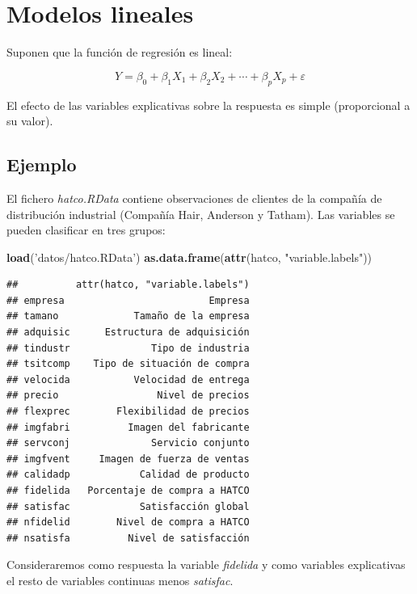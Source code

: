\documentclass[]{book}
\newenvironment{Shaded}{\begin{snugshade}}{\end{snugshade}}
\newcommand{\KeywordTok}[1]{\textcolor[rgb]{0.13,0.29,0.53}{\textbf{#1}}}
\newcommand{\StringTok}[1]{\textcolor[rgb]{0.31,0.60,0.02}{#1}}
\newcommand{\NormalTok}[1]{#1}
\begin{document}
\chapter{Modelos lineales}\label{modelos-lineales}

Suponen que la función de regresión es lineal:

\[Y=\beta_{0}+\beta_{1}X_{1}+\beta_{2}X_{2}+\cdots+\beta_{p}X_{p}+\varepsilon\]

El efecto de las variables explicativas sobre la respuesta es simple
(proporcional a su valor).

\section{Ejemplo}\label{ejemplo}

El fichero \emph{hatco.RData} contiene observaciones de clientes de la
compañía de distribución industrial (Compañía Hair, Anderson y Tatham).
Las variables se pueden clasificar en tres grupos:

\begin{Shaded}
\begin{Highlighting}[]
\KeywordTok{load}\NormalTok{(}\StringTok{'datos/hatco.RData'}\NormalTok{)}
\KeywordTok{as.data.frame}\NormalTok{(}\KeywordTok{attr}\NormalTok{(hatco, }\StringTok{"variable.labels"}\NormalTok{))}
\end{Highlighting}
\end{Shaded}

\begin{verbatim}
##          attr(hatco, "variable.labels")
## empresa                         Empresa
## tamano             Tamaño de la empresa
## adquisic      Estructura de adquisición
## tindustr              Tipo de industria
## tsitcomp    Tipo de situación de compra
## velocida           Velocidad de entrega
## precio                 Nivel de precios
## flexprec        Flexibilidad de precios
## imgfabri          Imagen del fabricante
## servconj              Servicio conjunto
## imgfvent     Imagen de fuerza de ventas
## calidadp            Calidad de producto
## fidelida   Porcentaje de compra a HATCO
## satisfac            Satisfacción global
## nfidelid        Nivel de compra a HATCO
## nsatisfa          Nivel de satisfacción
\end{verbatim}

Consideraremos como respuesta la variable \emph{fidelida} y como
variables explicativas el resto de variables continuas menos
\emph{satisfac}.
\end{document}
